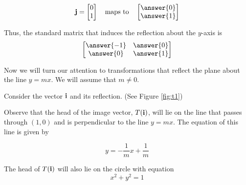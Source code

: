 \documentclass{ximera}
\renewcommand{\vec}[1]{{\bf #1}}
\begin{document}
  $$\vec{j}=\begin{bmatrix}0\\1\end{bmatrix}\quad\text{maps to}\quad\begin{bmatrix}\answer{0}\\\answer{1}\end{bmatrix}$$
  
  Thus, the standard matrix that induces the reflection about the $y$-axis is
  $$\begin{bmatrix}\answer{-1}&\answer{0}\\\answer{0}&\answer{1}\end{bmatrix}$$
  
  Now we will turn our attention to transformations that reflect the plane about the line $y=mx$.  We will assume that $m\neq 0$.
  
  Consider the vector $\vec{i}$ and its reflection. (See Figure \ref{fig:t1})
\begin{center}  
  \end{center}
   
   
   
   Observe that the head of the image vector, $T(\vec{i})$, will lie on the line that passes through $(1,0)$ and is perpendicular to the line $y=mx$.  The equation of this line is given by
   
   \begin{equation}\label{eq:reflectionline} 
   y=-\frac{1}{m}x+\frac{1}{m}
   \end{equation}
   
 The head of $T(\vec{i})$ will also lie on the circle with equation
   $$x^2+y^2=1$$
   
\end{document}
